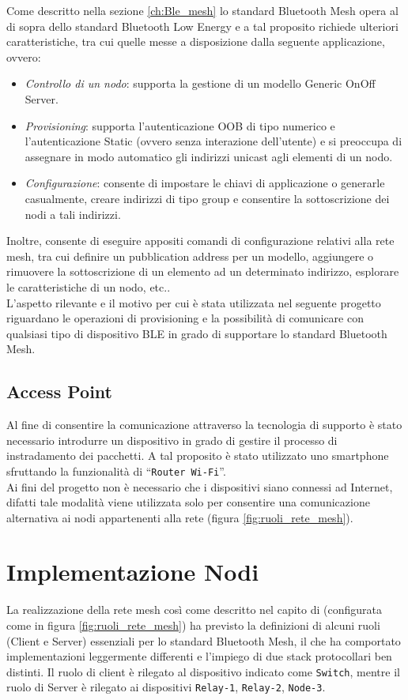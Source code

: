 Come descritto nella sezione \ref{ch:Ble_mesh} lo standard Bluetooth Mesh opera al di sopra dello standard Bluetooth Low Energy e a tal proposito richiede ulteriori caratteristiche, tra cui quelle messe a disposizione dalla seguente applicazione, ovvero: 
\begin{itemize}
    \item \textit{Controllo di un nodo}: supporta la gestione di un modello Generic OnOff Server.
    \item \textit{Provisioning}: supporta l'autenticazione OOB di tipo numerico e l'autenticazione Static (ovvero senza interazione dell'utente) e si preoccupa di assegnare in modo automatico gli indirizzi unicast agli elementi di un nodo.
    \item \textit{Configurazione}: consente di impostare le chiavi di applicazione o generarle casualmente, creare indirizzi di tipo group e consentire la sottoscrizione dei nodi a tali indirizzi.
\end{itemize}
Inoltre, consente di eseguire appositi comandi di configurazione relativi alla rete mesh, tra cui definire un pubblication address per un modello, aggiungere o rimuovere la sottoscrizione di un elemento ad un determinato indirizzo, esplorare le caratteristiche di un nodo, etc..\\
L'aspetto rilevante e il motivo per cui è stata utilizzata nel seguente progetto riguardano le operazioni di provisioning e la possibilità di comunicare con qualsiasi tipo di dispositivo BLE in grado di supportare lo standard Bluetooth Mesh.

\subsection{Access Point}
Al fine di consentire la comunicazione attraverso la tecnologia di supporto è stato necessario introdurre un dispositivo in grado di gestire il processo di instradamento dei pacchetti. A tal proposito è stato utilizzato uno smartphone sfruttando la funzionalità di ``\texttt{Router Wi-Fi}''. \\
Ai fini del progetto non è necessario che i dispositivi siano connessi ad Internet, difatti tale modalità viene utilizzata solo per consentire una comunicazione alternativa ai nodi appartenenti alla rete (figura \ref{fig:ruoli_rete_mesh}).

\section{Implementazione Nodi}
La realizzazione della rete mesh così come descritto nel capito di  (configurata come in figura \ref{fig:ruoli_rete_mesh}) ha previsto la definizioni di alcuni ruoli (Client e Server) essenziali per lo standard Bluetooth Mesh, il che ha comportato implementazioni leggermente differenti e l'impiego di due stack protocollari ben distinti.
Il ruolo di client è rilegato al dispositivo indicato come \texttt{Switch}, mentre il ruolo di Server è rilegato ai dispositivi \texttt{Relay-1}, \texttt{Relay-2}, \texttt{Node-3}.


